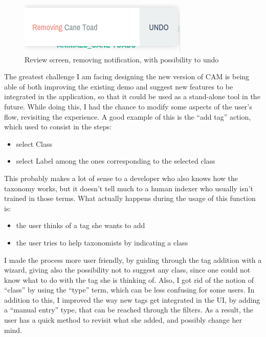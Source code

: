 \documentclass[12pt,oneside,svgnames]{memoir}
\begin{document}
\begin{figure}[htbp]
\centering
\includegraphics{./src/img/review-notification.png}
\caption{Review screen, removing notification, with possibility to undo}
\end{figure}

The greatest challenge I am facing designing the new version of CAM is
being able of both improving the existing demo and suggest new features
to be integrated in the application, so that it could be used as a
stand-alone tool in the future. While doing this, I had the chance to
modify some aspects of the user's flow, revisiting the experience. A
good example of this is the ``add tag'' action, which used to consist in
the steps:

\begin{itemize}
\itemsep1pt\parskip0pt
\item
  select Class
\item
  select Label among the ones corresponding to the selected class
\end{itemize}

This probably makes a lot of sense to a developer who also knows how the
taxonomy works, but it doesn't tell much to a human indexer who usually
isn't trained in those terms. What actually happens during the usage of
this function is:

\begin{itemize}
\itemsep1pt\parskip0pt
\item
  the user thinks of a tag she wants to add
\item
  the user tries to help taxonomists by indicating a class
\end{itemize}

I made the process more user friendly, by guiding through the tag
addition with a wizard, giving also the possibility not to suggest any
class, since one could not know what to do with the tag she is thinking
of. Also, I got rid of the notion of ``class'' by using the ``type''
term, which can be less confusing for some users. In addition to this, I
improved the way new tags get integrated in the UI, by adding a ``manual
entry'' type, that can be reached through the filters. As a result, the
user has a quick method to revisit what she added, and possibly change
her mind.
\end{document}
